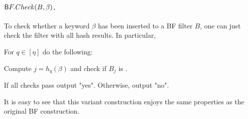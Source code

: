 \paragraph{$\sf BF.Check(B, \beta)$.}
To check whether a keyword $\beta$ has been inserted to a BF filter
$B$, one can just check the filter with all hash results. In particular, 
  \BI
  \item For $q \in [\eta]$ do the following: 
    \BI
    \item[] Compute  $j = h_q(\beta)$ and check if $B_j$ is . 
    \EI
  \item If all checks pass output "yes". Otherwise, output "no".
  \EI

It is easy to see that this variant construction enjoys the same
properties as the original BF construction. 


